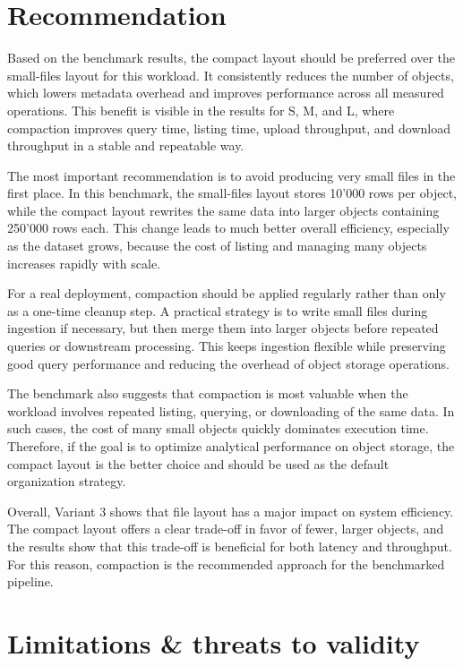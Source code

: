 \documentclass{article}
\begin{document}
\section{Recommendation}

Based on the benchmark results, the compact layout should be preferred over the small-files layout for this workload. It consistently reduces the number of objects, which lowers metadata overhead and improves performance across all measured operations. This benefit is visible in the results for S, M, and L, where compaction improves query time, listing time, upload throughput, and download throughput in a stable and repeatable way.

The most important recommendation is to avoid producing very small files in the first place. In this benchmark, the small-files layout stores 10'000 rows per object, while the compact layout rewrites the same data into larger objects containing 250'000 rows each. This change leads to much better overall efficiency, especially as the dataset grows, because the cost of listing and managing many objects increases rapidly with scale.

For a real deployment, compaction should be applied regularly rather than only as a one-time cleanup step. A practical strategy is to write small files during ingestion if necessary, but then merge them into larger objects before repeated queries or downstream processing. This keeps ingestion flexible while preserving good query performance and reducing the overhead of object storage operations.

The benchmark also suggests that compaction is most valuable when the workload involves repeated listing, querying, or downloading of the same data. In such cases, the cost of many small objects quickly dominates execution time. Therefore, if the goal is to optimize analytical performance on object storage, the compact layout is the better choice and should be used as the default organization strategy.

Overall, Variant 3 shows that file layout has a major impact on system efficiency. The compact layout offers a clear trade-off in favor of fewer, larger objects, and the results show that this trade-off is beneficial for both latency and throughput. For this reason, compaction is the recommended approach for the benchmarked pipeline.

\section{Limitations \& threats to validity}
\end{document}
